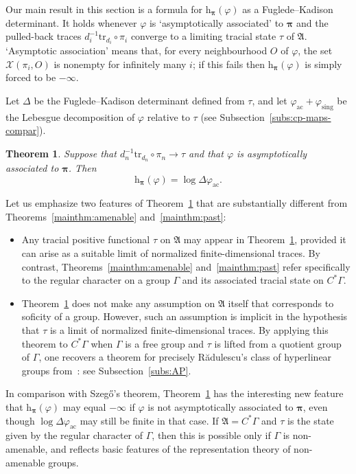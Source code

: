 \documentclass[12pt,a4paper]{article}
\numberwithin{equation}{section}
\newtheorem{mainthm}{Theorem}
\theoremstyle{remark}
\renewcommand{\rm}[1]{\mathrm{#1}}
\newcommand{\rmh}{\mathrm{h}}
\newcommand{\X}{\mathcal{X}}
\newcommand{\A}{\mathfrak{A}}
\newcommand{\G}{\Gamma}
\renewcommand{\phi}{\varphi}
\newcommand{\bspi}{\boldsymbol{\pi}}
\newcommand{\Tr}{\mathrm{tr}}
\begin{document}
Our main result in this section is a formula for $\rmh_{\bspi}(\phi)$ as a Fuglede--Kadison determinant.  It holds whenever $\phi$ is `asymptotically associated' to $\bspi$ and the pulled-back traces $d_i^{-1}\Tr_{d_i}\circ \pi_i$ converge to a limiting tracial state $\tau$ of $\A$.  `Asymptotic association' means that, for every neighbourhood $O$ of $\phi$, the set $\X(\pi_i,O)$ is nonempty for infinitely many $i$; if this fails then $\rmh_{\bspi}(\phi)$ is simply forced to be $-\infty$.

Let $\Delta$ be the Fuglede--Kadison determinant defined from $\tau$, and let $\phi_\rm{ac} + \phi_\rm{sing}$ be the Lebesgue decomposition of $\phi$ relative to $\tau$ (see Subsection~\ref{subs:cp-maps-compar}).

\begin{mainthm}\label{mainthm:det-form}
Suppose that $d_n^{-1}\Tr_{d_n}\circ \pi_n \to \tau$ and that $\phi$ is asymptotically associated to $\bspi$. Then
\[\rmh_{\bspi}(\phi) = \log \Delta \phi_{\rm{ac}}.\]
\end{mainthm}

Let us emphasize two features of Theorem~\ref{mainthm:det-form} that are substantially different from Theorems~\ref{mainthm:amenable} and~\ref{mainthm:past}:
\begin{itemize}
\item Any tracial positive functional $\tau$ on $\A$ may appear in Theorem~\ref{mainthm:det-form}, provided it can arise as a suitable limit of normalized finite-dimensional traces.  By contrast, Theorems~\ref{mainthm:amenable} and~\ref{mainthm:past} refer specifically to the regular character on a group $\G$ and its associated tracial state on $C^\ast \G$.
\item Theorem~\ref{mainthm:det-form} does not make any assumption on $\A$ itself that corresponds to soficity of a group.  However, such an assumption is implicit in the hypothesis that $\tau$ is a limit of normalized finite-dimensional traces.  By applying this theorem to $C^\ast \G$ when $\G$ is a free group and $\tau$ is lifted from a quotient group of $\G$, one recovers a theorem for precisely R\u{a}dulescu's class of hyperlinear groups from~\cite{Rad08}: see Subsection~\ref{subs:AP}.
\end{itemize}

In comparison with Szeg\H{o}'s theorem, Theorem~\ref{mainthm:det-form} has the interesting new feature that $\rmh_{\bspi}(\phi)$ may equal $-\infty$ if $\phi$ is not asymptotically associated to $\bspi$, even though $\log \Delta \phi_{\rm{ac}}$ may still be finite in that case.  If $\A = C^\ast \G$ and $\tau$ is the state given by the regular character of $\G$, then this is possible only if $\G$ is non-amenable, and reflects basic features of the representation theory of non-amenable groups.
\end{document}
